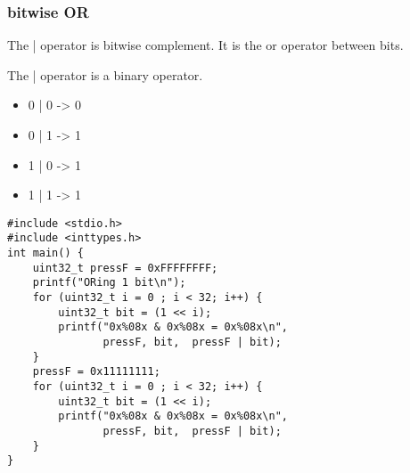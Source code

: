 \documentclass[11pt]{article}
\begin{document}
\subsubsection{bitwise OR}
\label{sec:org4ba8f85}

The | operator is bitwise complement. It is the or operator between
bits. 

The | operator is a binary operator.

\begin{itemize}
\item 0 | 0 -> 0
\item 0 | 1 -> 1
\item 1 | 0 -> 1
\item 1 | 1 -> 1
\end{itemize}

\begin{verbatim}
#include <stdio.h>
#include <inttypes.h>
int main() {  
    uint32_t pressF = 0xFFFFFFFF;
    printf("ORing 1 bit\n");
    for (uint32_t i = 0 ; i < 32; i++) {
        uint32_t bit = (1 << i);
        printf("0x%08x & 0x%08x = 0x%08x\n",
               pressF, bit,  pressF | bit);
    }
    pressF = 0x11111111;
    for (uint32_t i = 0 ; i < 32; i++) {
        uint32_t bit = (1 << i);
        printf("0x%08x & 0x%08x = 0x%08x\n",
               pressF, bit,  pressF | bit);
    }
}
\end{verbatim}
\end{document}
